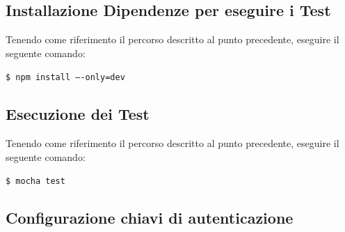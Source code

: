 \documentclass[../ManualeSviluppatore_v1.0.0.tex]{subfiles}
\begin{document}
	\subsection{Installazione Dipendenze per eseguire i Test}
		Tenendo come riferimento il percorso descritto al punto precedente, eseguire il seguente comando:
			\begin{center}
				\texttt{\$ npm install ----only=dev}
			\end{center}
	\subsection{Esecuzione dei Test}
		Tenendo come riferimento il percorso descritto al punto precedente, eseguire il seguente comando:
			\begin{center}
				\texttt{\$ mocha test}
			\end{center}
	\subsection{Configurazione chiavi di autenticazione}
\end{document}
